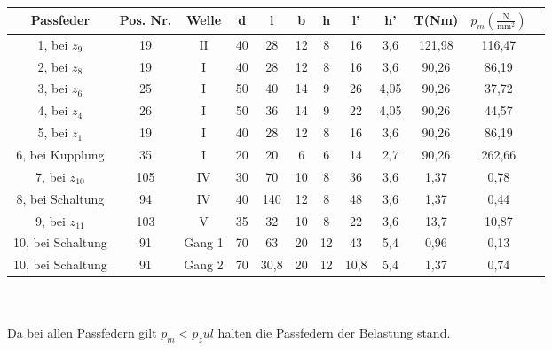 \begin{tabular}{|c|c|c|c|c|c|c|c|c|c|c|c|}\hline
	 Passfeder & Pos. Nr. &Welle & d & l & b & h & l' & h' & T(Nm) & $p_m(\frac{\text{N}}{\text{mm}^2})$ \\ \hline \hline
	 1, bei $z_9$ & 19 & $\mathrm{II}$ &40 & 28 & 12 & 8 & 16 & 3,6 & 121,98 & 116,47 \\ \hline
	 2, bei $z_8$ & 19 &$\mathrm{I}$ & 40 & 28 & 12 & 8 & 16 & 3,6 & 90,26 & 86,19 \\ \hline
	 3, bei $z_6$ & 25 &$\mathrm{I}$ & 50 & 40 & 14 & 9 & 26 & 4,05 & 90,26 & 37,72 \\ \hline
	4, bei $z_4$ & 26 &$\mathrm{I}$ &  50 & 36 & 14 & 9 & 22 & 4,05 & 90,26 & 44,57 \\ \hline
	5, bei $z_1$ & 19 & $\mathrm{I}$ & 40 & 28 & 12 & 8 & 16 & 3,6 & 90,26 & 86,19 \\ \hline
	 6, bei Kupplung & 35 &$\mathrm{I}$ & 20 & 20 & 6 & 6 & 14 & 2,7 & 90,26 & 262,66 \\ \hline
	 7, bei $z_{10}$ & 105 &$\mathrm{IV}$ & 30 & 70 & 10 & 8 & 36 & 3,6 & 1,37 & 0,78 \\ \hline
	 8, bei Schaltung & 94 &$\mathrm{IV}$ & 40 & 140 & 12 & 8 & 48 & 3,6 & 1,37 & 0,44 \\ \hline
	 9, bei $z_{11}$ & 103 & $\mathrm{V}$ &35 & 32 & 10 & 8 & 22 & 3,6 & 13,7 & 10,87 \\ \hline
	 10, bei Schaltung & 91 &Gang 1 & 70 & 63 & 20 & 12 & 43 & 5,4 & 0,96 & 0,13 \\ \hline
	 10, bei Schaltung & 91 & Gang 2 &70 & 30,8 & 20 & 12 & 10,8 & 5,4 & 1,37 & 0,74 \\ \hline
\end{tabular} \\
\vspace{.5cm}
\\ Da bei allen Passfedern gilt $p_m < p_zul$ halten die Passfedern der Belastung stand.